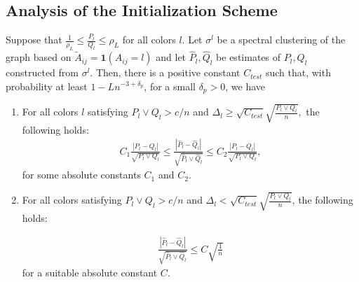\documentclass{article}
\begin{document}

\subsection{Analysis of the Initialization Scheme}
\label{appendix: init}
\begin{proposition}
\label{prop:initial_guarantee}
Suppose that $\frac{1}{\rho_L} \leq \frac{P_l}{Q_l} \leq \rho_L$ for all colors $l$. Let $\sigma^l$ be a spectral clustering of the graph based on $\tilde{A}_{ij} = \mathbf{1}(A_{ij} = l)$ and let $\hat{P}_l, \hat{Q}_l$ be estimates of $P_l, Q_l$ constructed from $\sigma^l$. Then, there is a positive constant $C_{test}$ such that, with probability at least $1 - Ln^{-3 + \delta_p}$, for a small $\delta_p > 0$, we have

\begin{enumerate} 
\item For all colors $l$ satisfying $P_l \vee Q_l > c/n$ and $\Delta_l \geq \sqrt{C_{test}} \sqrt{ \frac{P_l \vee Q_l}{n}},$ the following holds: 
\begin{align}
C_1 \frac{ | P_l - Q_l |}{\sqrt{P_l \vee Q_l}}  \leq \frac{ | \hat{P}_l - \hat{Q}_l| }{\sqrt{ \hat{P}_l \vee \hat{Q}_l }} \leq  
C_2 \frac{ | P_l - Q_l | }{\sqrt{ P_l \vee Q_l}},
\end{align}
for some absolute constants $C_1$ and $C_2$.

\item For all colors satisfying $P_l \vee Q_l > c/n$ and $\Delta_l <  \sqrt{C_{test}} \sqrt{ \frac{P_l \vee Q_l}{n} }$, the following holds:

\begin{align}
\frac{ | \hat{P}_l - \hat{Q}_l|}{\sqrt{ \hat{P}_l \vee \hat{Q}_l}} \leq C \sqrt{ \frac{1}{n} } 
\label{eqn:bad_l_initialization}
\end{align}
for a suitable absolute constant $C$.
\end{enumerate}
\end{proposition}
\end{document}

